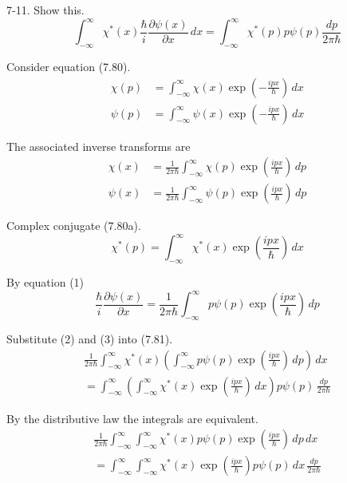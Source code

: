 \documentclass[12pt]{article}
\begin{document}
7-11.
Show this.
\begin{equation*}
\int_{-\infty}^\infty
\chi^*(x)\frac{\hbar}{i}\frac{\partial\psi(x)}{\partial x}\,dx
=\int_{-\infty}^\infty
\chi^*(p)p\psi(p)\frac{dp}{2\pi\hbar}
\tag{7.81}
\end{equation*}

Consider equation (7.80).
\begin{align*}
\chi(p)&=\int_{-\infty}^\infty\chi(x)\exp\left(-\frac{ipx}{\hbar}\right)\,dx
\tag{7.80a}
\\
\psi(p)&=\int_{-\infty}^\infty\psi(x)\exp\left(-\frac{ipx}{\hbar}\right)\,dx
\tag{7.80b}
\end{align*}

The associated inverse transforms are
\begin{align*}
\chi(x)&=\frac{1}{2\pi\hbar}\int_{-\infty}^\infty\chi(p)\exp\left(\frac{ipx}{\hbar}\right)\,dp
\\
\psi(x)&=\frac{1}{2\pi\hbar}\int_{-\infty}^\infty\psi(p)\exp\left(\frac{ipx}{\hbar}\right)\,dp
\tag{1}
\end{align*}

Complex conjugate (7.80a).
\begin{equation*}
\chi^*(p)=\int_{-\infty}^\infty\chi^*(x)\exp\left(\frac{ipx}{\hbar}\right)\,dx
\tag{2}
\end{equation*}

By equation (1)
\begin{equation*}
\frac{\hbar}{i}\frac{\partial\psi(x)}{\partial x}=
\frac{1}{2\pi\hbar}\int_{-\infty}^\infty p\psi(p)\exp\left(\frac{ipx}{\hbar}\right)\,dp
\tag{3}
\end{equation*}

Substitute (2) and (3) into (7.81).
\begin{multline*}
\frac{1}{2\pi\hbar}\int_{-\infty}^\infty
\chi^*(x)
\left(\int_{-\infty}^\infty p\psi(p)\exp\left(\frac{ipx}{\hbar}\right)\,dp\right)
\,dx
\\
=\int_{-\infty}^\infty
\left(\int_{-\infty}^\infty\chi^*(x)\exp\left(\frac{ipx}{\hbar}\right)\,dx\right)
p\psi(p)\,\frac{dp}{2\pi\hbar}
\end{multline*}

By the distributive law the integrals are equivalent.
\begin{multline*}
\frac{1}{2\pi\hbar}\int_{-\infty}^\infty\int_{-\infty}^\infty
\chi^*(x)
p\psi(p)\exp\left(\frac{ipx}{\hbar}\right)
\,dp\,dx
\\
=\int_{-\infty}^\infty\int_{-\infty}^\infty
\chi^*(x)\exp\left(\frac{ipx}{\hbar}\right)
p\psi(p)
\,dx\,\frac{dp}{2\pi\hbar}
\end{multline*}
\end{document}
